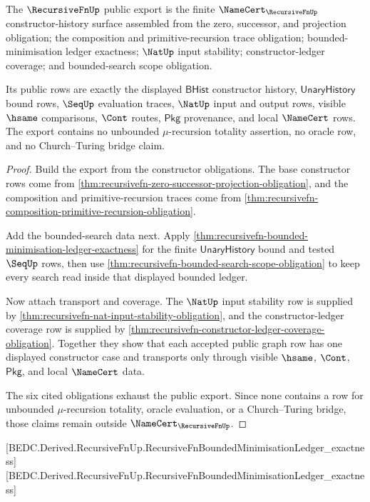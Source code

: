 \begin{theorem}
\label{thm:recursivefn-public-constructor-history-export}
The $\RecursiveFnUp$ public export is the finite
$\NameCert_{\RecursiveFnUp}$ constructor-history surface assembled from the
zero, successor, and projection obligation; the composition and
primitive-recursion trace obligation; bounded-minimisation ledger exactness;
$\NatUp$ input stability; constructor-ledger coverage; and bounded-search
scope obligation.

Its public rows are exactly the displayed $\mathsf{BHist}$ constructor
history, $\mathsf{UnaryHistory}$ bound rows, $\SeqUp$ evaluation traces,
$\NatUp$ input and output rows, visible $\hsame$ comparisons, $\Cont$ routes,
$\mathsf{Pkg}$ provenance, and local $\NameCert$ rows. The export contains no
unbounded $\mu$-recursion totality assertion, no oracle row, and no
Church--Turing bridge claim.
\end{theorem}
\begin{proof}
Build the export from the constructor obligations. The base constructor rows
come from \autoref{thm:recursivefn-zero-successor-projection-obligation}, and
the composition and primitive-recursion traces come from
\autoref{thm:recursivefn-composition-primitive-recursion-obligation}.

Add the bounded-search data next. Apply
\autoref{thm:recursivefn-bounded-minimisation-ledger-exactness} for the finite
$\mathsf{UnaryHistory}$ bound and tested $\SeqUp$ rows, then use
\autoref{thm:recursivefn-bounded-search-scope-obligation} to keep every search
read inside that displayed bounded ledger.

Now attach transport and coverage. The $\NatUp$ input stability row is supplied
by \autoref{thm:recursivefn-nat-input-stability-obligation}, and the
constructor-ledger coverage row is supplied by
\autoref{thm:recursivefn-constructor-ledger-coverage-obligation}. Together they
show that each accepted public graph row has one displayed constructor case and
transports only through visible $\hsame$, $\Cont$, $\mathsf{Pkg}$, and local
$\NameCert$ data.

The six cited obligations exhaust the public export. Since none contains a row
for unbounded $\mu$-recursion totality, oracle evaluation, or a
Church--Turing bridge, those claims remain outside
$\NameCert_{\RecursiveFnUp}$.
\end{proof}

[BEDC.Derived.RecursiveFnUp.RecursiveFnBoundedMinimisationLedger\_exactness]
[BEDC.Derived.RecursiveFnUp.RecursiveFnBoundedMinimisationLedger\_exactness]

